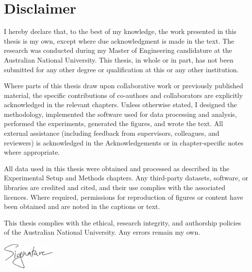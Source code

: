 \section*{Disclaimer}

I hereby declare that, to the best of my knowledge, the work presented in this thesis is my own, except where due acknowledgment is made in the text. The research was conducted during my Master of Engineering candidature at the Australian National University. This thesis, in whole or in part, has not been submitted for any other degree or qualification at this or any other institution.

Where parts of this thesis draw upon collaborative work or previously published material, the specific contributions of co-authors and collaborators are explicitly acknowledged in the relevant chapters. Unless otherwise stated, I designed the methodology, implemented the software used for data processing and analysis, performed the experiments, generated the figures, and wrote the text. All external assistance (including feedback from supervisors, colleagues, and reviewers) is acknowledged in the Acknowledgements or in chapter-specific notes where appropriate.

All data used in this thesis were obtained and processed as described in the Experimental Setup and Methods chapters. Any third-party datasets, software, or libraries are credited and cited, and their use complies with the associated licences. Where required, permissions for reproduction of figures or content have been obtained and are noted in the captions or text.

This thesis complies with the ethical, research integrity, and authorship policies of the Australian National University. Any errors remain my own.

\vspace{1cm}
\begin{flushright}
	\includegraphics[width=0.2\textwidth]{signature.pdf}\\[2mm]
	\fullname
	
	\fullthesisdate
\end{flushright}

